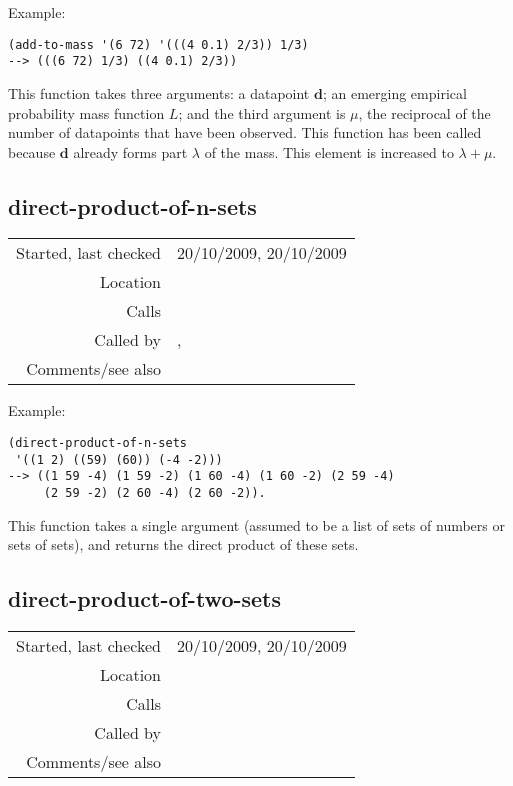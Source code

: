\vspace{0.5cm}
\noindent Example:
\begin{verbatim}
(add-to-mass '(6 72) '(((4 0.1) 2/3)) 1/3)
--> (((6 72) 1/3) ((4 0.1) 2/3))
\end{verbatim}

\noindent This function takes three arguments: a
datapoint $\mathbf{d}$; an emerging empirical
probability mass function $L$; and the third argument
is $\mu$, the reciprocal of the number of datapoints
that have been observed. This function has been called
because $\mathbf{d}$ already forms part $\lambda$ of
the mass. This element is increased to $\lambda +
\mu$.


\subsection*{direct-product-of-n-sets}\label{fun:direct-product-of-n-sets}

\vspace{0.3cm}
\begin{tabular}{r|p{8cm}}
Started, last checked & 20/10/2009, 20/10/2009 \\
Location & \nameref{sec:empirical-preliminaries} \\
Calls & \nameref{fun:direct-product-of-two-sets} \\
Called by & \nameref{fun:likelihood-of-pattern-or-translation}, \nameref{fun:likelihood-of-translations-geometric-mean} \\
Comments/see also &
\end{tabular}

\vspace{0.5cm}
\noindent Example:
\begin{verbatim}
(direct-product-of-n-sets
 '((1 2) ((59) (60)) (-4 -2)))
--> ((1 59 -4) (1 59 -2) (1 60 -4) (1 60 -2) (2 59 -4)
     (2 59 -2) (2 60 -4) (2 60 -2)).
\end{verbatim}

\noindent This function takes a single argument
(assumed to be a list of sets of numbers or sets of
sets), and returns the direct product of these
sets.


\subsection*{direct-product-of-two-sets}\label{fun:direct-product-of-two-sets}

\vspace{0.3cm}
\begin{tabular}{r|p{8cm}}
Started, last checked & 20/10/2009, 20/10/2009 \\
Location & \nameref{sec:empirical-preliminaries} \\
Calls & \\
Called by & \nameref{fun:direct-product-of-n-sets} \\
Comments/see also &
\end{tabular}

